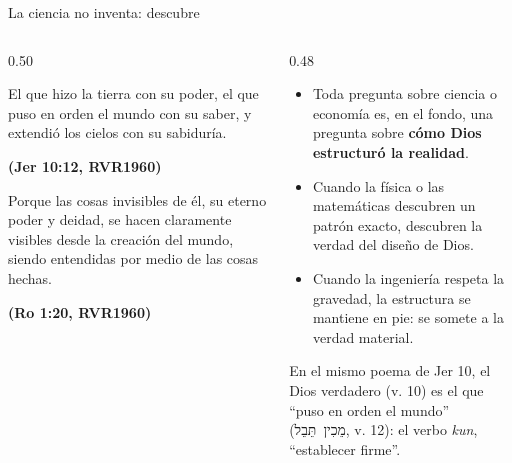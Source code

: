 \documentclass[hyperref={bookmarks=false},aspectratio=169]{beamer}
\newcommand{\heb}[1]{\mbox{\foreignlanguage{hebrew}{#1}}}
\newcommand{\fuente}[1]{\par\hfill{\upshape\bfseries\footnotesize\textcolor{azul}{#1}}}
\newcommand{\destacar}[1]{\textbf{\textcolor{azul}{#1}}}
\begin{document}
\begin{frame}{La ciencia no inventa: descubre}
\begin{columns}[c,onlytextwidth]
\begin{column}{0.50\textwidth}
\begin{cita}El que hizo la tierra con su poder, el que puso en orden el mundo con su saber, y extendió los cielos con su sabiduría.\fuente{(Jer 10:12, RVR1960)}\end{cita}
\begin{cita}Porque las cosas invisibles de él, su eterno poder y deidad, se hacen claramente visibles desde la creación del mundo, siendo entendidas por medio de las cosas hechas.\fuente{(Ro 1:20, RVR1960)}\end{cita}
\end{column}
\begin{column}{0.48\textwidth}\small
\begin{itemize}
\item Toda pregunta sobre ciencia o economía es, en el fondo, una pregunta sobre \destacar{cómo Dios estructuró la realidad}.
\item Cuando la física o las matemáticas descubren un patrón exacto, descubren la verdad del diseño de Dios.
\item Cuando la ingeniería respeta la gravedad, la estructura se mantiene en pie: se somete a la verdad material.
\end{itemize}
\scriptsize En el mismo poema de Jer 10, el Dios verdadero (v. 10) es el que ``puso en orden el mundo'' (\heb{מֵכִין תֵּבֵל}, v. 12): el verbo \emph{kun}, ``establecer firme''.
\end{column}
\end{columns}
\end{frame}
\end{document}
